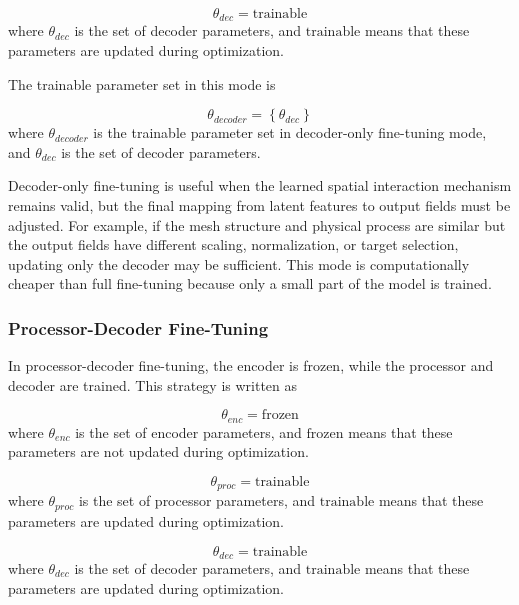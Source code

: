 \begin{equation}
\theta_{dec}
=
\text{trainable}
\end{equation}
where \(\theta_{dec}\) is the set of decoder parameters, and \(\text{trainable}\) means that these parameters are updated during optimization.

The trainable parameter set in this mode is

\begin{equation}
\theta_{decoder}
=
\left\{
\theta_{dec}
\right\}
\end{equation}
where \(\theta_{decoder}\) is the trainable parameter set in decoder-only fine-tuning mode, and \(\theta_{dec}\) is the set of decoder parameters.

Decoder-only fine-tuning is useful when the learned spatial interaction mechanism remains valid, but the final mapping from latent features to output fields must be adjusted. For example, if the mesh structure and physical process are similar but the output fields have different scaling, normalization, or target selection, updating only the decoder may be sufficient. This mode is computationally cheaper than full fine-tuning because only a small part of the model is trained.

\subsubsection{Processor-Decoder Fine-Tuning}

In processor-decoder fine-tuning, the encoder is frozen, while the processor and decoder are trained. This strategy is written as

\begin{equation}
\theta_{enc}
=
\text{frozen}
\end{equation}
where \(\theta_{enc}\) is the set of encoder parameters, and \(\text{frozen}\) means that these parameters are not updated during optimization.

\begin{equation}
\theta_{proc}
=
\text{trainable}
\end{equation}
where \(\theta_{proc}\) is the set of processor parameters, and \(\text{trainable}\) means that these parameters are updated during optimization.

\begin{equation}
\theta_{dec}
=
\text{trainable}
\end{equation}
where \(\theta_{dec}\) is the set of decoder parameters, and \(\text{trainable}\) means that these parameters are updated during optimization.

